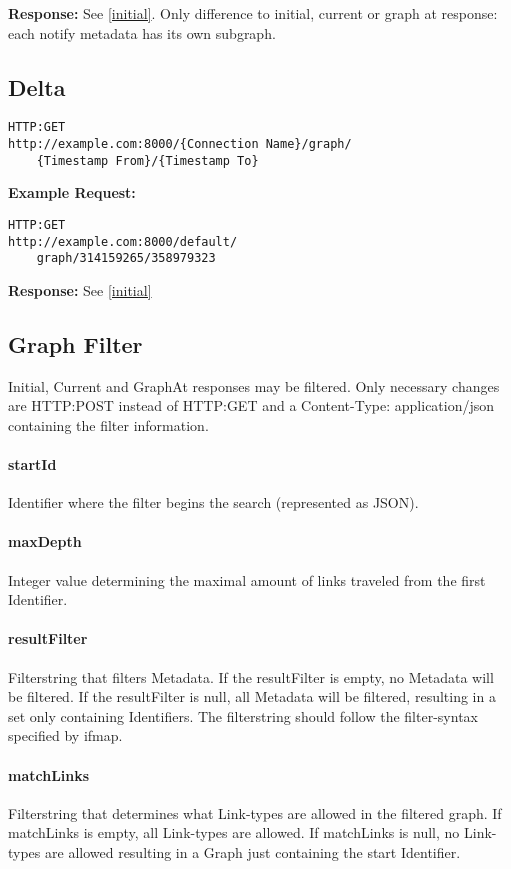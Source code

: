 \textbf{Response:}
See \ref{initial}. Only difference to initial, current or graph at response: each notify metadata has its own subgraph.


\subsection{Delta}
\begin{lstlisting}
HTTP:GET
http://example.com:8000/{Connection Name}/graph/
	{Timestamp From}/{Timestamp To}
\end{lstlisting}

\begin{minipage}{\linewidth}
\textbf{Example Request:}
\begin{lstlisting}
HTTP:GET
http://example.com:8000/default/
	graph/314159265/358979323
\end{lstlisting}
\end{minipage}

\begin{minipage}{\linewidth}
\textbf{Response:}
See \ref{initial}
\end{minipage}

\subsection{Graph Filter}
Initial, Current and GraphAt responses may be filtered. Only necessary changes are HTTP:POST instead of HTTP:GET and a Content-Type: application/json containing the filter information.

\paragraph{startId}
Identifier where the filter begins the search (represented as JSON).
\paragraph{maxDepth}
Integer value determining the maximal amount of links traveled from the first Identifier.
\paragraph{resultFilter}
Filterstring that filters Metadata. If the resultFilter is empty, no Metadata will be filtered. If the resultFilter is null, all Metadata will be filtered, resulting in a set only containing Identifiers. The filterstring should follow the filter-syntax specified by ifmap.
\paragraph{matchLinks}
Filterstring that determines what Link-types are allowed in the filtered graph. If matchLinks is empty, all Link-types are allowed. If matchLinks is null, no Link-types are allowed resulting in a Graph just containing the start Identifier.

